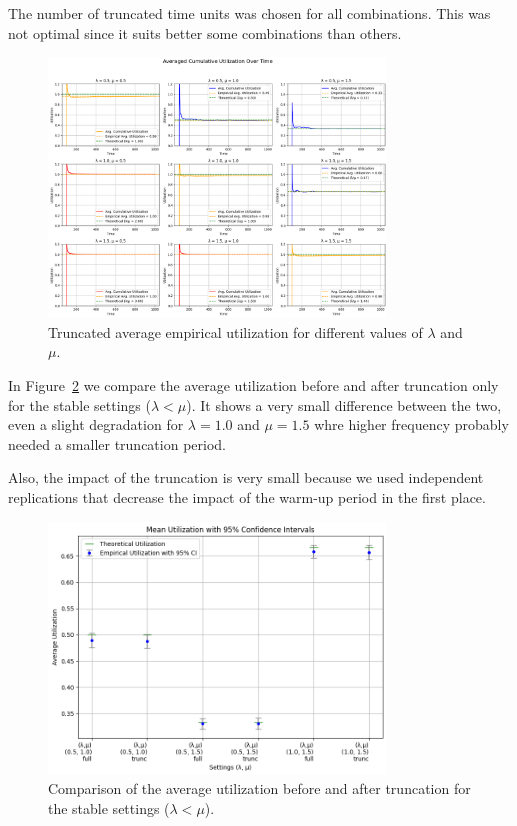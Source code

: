 \documentclass[a4paper]{article}
\begin{document}
The number of truncated time units was chosen for all combinations. This was not optimal since it suits better some combinations than others.

\begin{figure}[htbp]
  \centering
  \includegraphics[width=0.8\textwidth]{images/ex1_p2_trunc_util.png}
  \caption{
    Truncated average empirical utilization for different values of $\lambda$ and $\mu$.
  }\label{fig:e1p2-trunc-util}
\end{figure}

In Figure~\ref{fig:e1p2-compare} we compare the average utilization before and after truncation only for the stable settings ($\lambda < \mu$). It shows a very small difference between the two, even a slight degradation for $\lambda = 1.0$ and $\mu = 1.5$ whre higher frequency probably needed a smaller truncation period.

Also, the impact of the truncation is very small because we used independent replications that decrease the impact of the warm-up period in the first place.

\begin{figure}[htbp]
  \centering
  \includegraphics[width=0.8\textwidth]{images/ex1_p2_compare.png}
  \caption{
    Comparison of the average utilization before and after truncation for the stable settings ($\lambda < \mu$).
  }\label{fig:e1p2-compare}
\end{figure}
\end{document}
